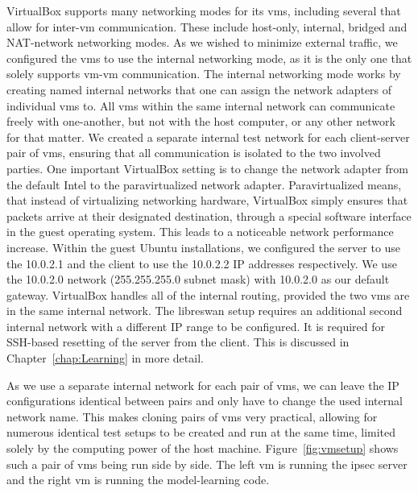 VirtualBox supports many networking modes for its \acp{vm}, including several that allow for inter-\ac{vm} communication. These include host-only, internal, bridged and NAT-network networking modes.
As we wished to minimize external traffic, we configured the \acp{vm} to use the internal networking mode, as it is the only one that solely supports \ac{vm}-\ac{vm} communication.
The internal networking mode works by creating named internal networks that one can assign the network adapters of individual \acp{vm} to. All \acp{vm} within the same internal network can communicate freely with one-another, but not with the host computer, or any other network for that matter. We created a separate internal test network for each client-server pair of \acp{vm}, ensuring that all communication is isolated to the two involved parties. One important VirtualBox setting is to change the network adapter from the default Intel to the paravirtualized network adapter. Paravirtualized means, that instead of virtualizing networking hardware, VirtualBox simply ensures that packets arrive at their designated destination, through a special software interface in the guest operating system. This leads to a noticeable network performance increase. Within the guest Ubuntu installations, we configured the server to use the 10.0.2.1 and the client to use the 10.0.2.2 IP addresses respectively. We use the 10.0.2.0 network (255.255.255.0 subnet mask) with 10.0.2.0 as our default gateway. VirtualBox handles all of the internal routing, provided the two \acp{vm} are in the same internal network. The libreswan setup requires an additional second internal network with a different IP range to be configured. It is required for SSH-based resetting of the server from the client. This is discussed in Chapter~\ref{chap:Learning} in more detail.

As we use a separate internal network for each pair of \acp{vm}, we can leave the IP configurations identical between pairs and only have to change the used internal network name. This makes cloning pairs of \acp{vm} very practical, allowing for numerous identical test setups to be created and run at the same time, limited solely by the computing power of the host machine. Figure~\ref{fig:vmsetup} shows such a pair of \acp{vm} being run side by side. The left \ac{vm} is running the \ac{ipsec} server and the right \ac{vm} is running the model-learning code.

